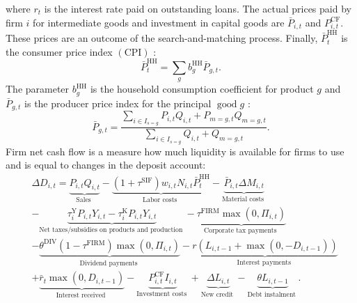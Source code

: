  where $r_t$ is the interest rate paid on outstanding loans. The actual prices paid by firm $i$ for intermediate goods and investment in capital goods are  $\bar{P}_{i,t}$ and $P_{i,t}^{\mathrm{CF}}$. These prices are an outcome of the search-and-matching process. Finally, $\bar{P}_t^{\mathrm{HH}} $ is the consumer price index $(\mathrm{CPI})$ :
\begin{equation}
    \bar{P}_t^{\mathrm{HH}} =\sum_g b_g^{\mathrm{HH}} \bar{P}_{g,t}. 
\end{equation}
The parameter $b_g^{\mathrm{HH}}$ is the household consumption coefficient for product $g$ and $\bar{P}_{g,t}$ is the producer price index for the principal $\operatorname{good} g$ :
\begin{equation}
    \bar{P}_{g,t}=\frac{\sum_{i \in I_{s=g}} P_{i,t} Q_{i,t}+P_{m=g,t}  Q_{m=g,t} }{\sum_{i \in I_{s=g}} Q_{i,t}+Q_{m=g,t} } .
\end{equation}
Firm net cash flow is a measure how much liquidity is available for firms to use and is equal to changes in the deposit account:
\begin{equation}
\begin{aligned}
& \Delta D_{i,t}=\underbrace{P_{i,t} Q_{i,t}}_{\text {Sales }}-\underbrace{\left(1+\tau^{\mathrm{SIF}}\right) w_{i,t} N_{i,t} \bar{P}_t^{\mathrm{HH}}}_{\text {Labor costs }}-\underbrace{\bar{P}_{i,t} \Delta M_{i,t}}_{\text {Material costs }} \\
& -\underbrace{\tau_i^{\mathrm{Y}} P_{i,t} Y_{i,t}-\tau_i^{\mathrm{K}} P_{i,t} Y_{i,t}}_{\text {Net taxes/subsidies on products and production }}-\underbrace{\tau^{\mathrm{FIRM}} \max \left(0, \Pi_{i,t}\right)}_{\text {Corporate tax payments }} \\
& -\underbrace{\theta^{\mathrm{DIV}}\left(1-\tau^{\mathrm{FIRM}}\right) \max \left(0, \Pi_{i,t}\right)}_{\text {Dividend payments }}-\underbrace{r\left(L_{i,t-1}+\max \left(0,-D_{i,t-1}\right)\right)}_{\text {Interest payments }} \\
& +\underbrace{\bar{r}_t \max \left(0, D_{i,t-1}\right)}_{\text {Interest received }}-\underbrace{P_{i,t}^{\mathrm{CF}} I_{i,t}}_{\text {Investment costs }}+\underbrace{\Delta L_{i,t}}_{\text {New credit }}-\underbrace{\theta L_{i,t-1}}_{\text {Debt instalment }} . \\
&
\end{aligned}
\end{equation}

